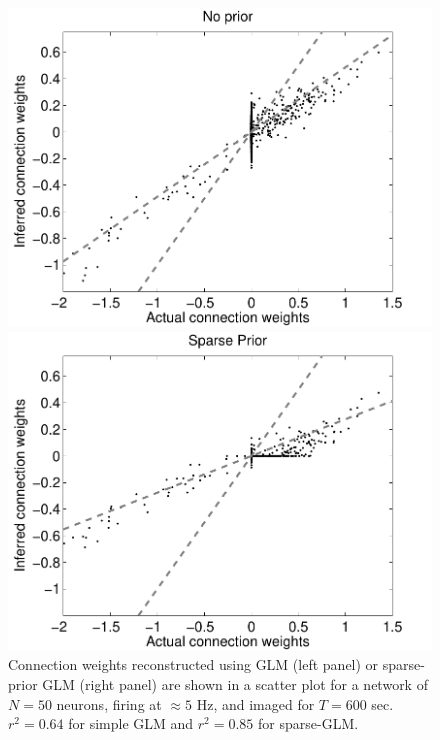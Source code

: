 \begin{figure}[h]
\centering
\begin{minipage}[c]{0.45\hsize}
\includegraphics[width=\hsize]{../figs/FigureA10_regular_sol}
\end{minipage}
\begin{minipage}[c]{0.45\hsize}
\includegraphics[width=\hsize]{../figs/FigureA10_sparse_sol}
\end{minipage}
\caption{Connection weights reconstructed using GLM (left panel) or sparse-prior GLM (right panel) are shown in a scatter plot for a network of $N=50$ neurons, firing at $\approx 5$ Hz, and imaged for $T=600$ sec. $r^2=0.64$ for simple GLM and $r^2=0.85$ for sparse-GLM.}
\label{fig:sparse}
\end{figure}

